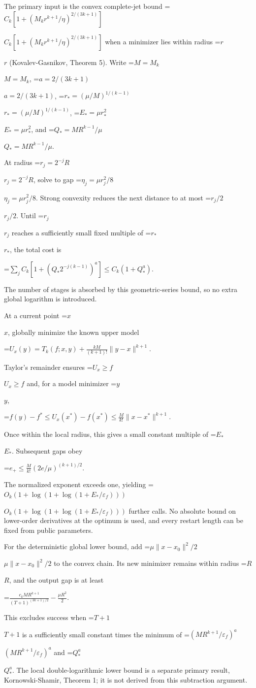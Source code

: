 \documentclass[10pt,a4paper]{article}
\newcommand{\AtlasMath}[1]{\par\begingroup\centering\setbox0=\hbox{$\displaystyle #1$}\ifdim\wd0>1.4\linewidth\typeout{ATLAS WIDE FORMULA: \the\wd0}\fi\ifdim\wd0>\linewidth\resizebox{\linewidth}{!}{\box0}\else\box0\fi\par\endgroup}
\newcommand{\AtlasInlineMath}[1]{\begingroup\setbox0=\hbox{$#1$}\ifdim\wd0>.4\linewidth\endgroup\AtlasMath{#1}\else\endgroup$#1$\fi}
\begin{document}
The primary input is the convex complete-jet bound \AtlasInlineMath{C_k[1+(M_kr^{k+1}/\eta)^{2/(3k+1)}]} when a minimizer lies within radius \AtlasInlineMath{r} (Kovalev-Gasnikov, Theorem 5). Write \AtlasInlineMath{M=M_k}, \AtlasInlineMath{a=2/(3k+1)}, \AtlasInlineMath{r_*=(\mu/M)^{1/(k-1)}}, \AtlasInlineMath{E_* =\mu r_*^2}, and \AtlasInlineMath{Q_*=MR^{k-1}/\mu}.

At radius \AtlasInlineMath{r_j=2^{-j}R}, solve to gap \AtlasInlineMath{\eta_j=\mu r_j^2/8}. Strong convexity reduces the next distance to at most \AtlasInlineMath{r_j/2}. Until \AtlasInlineMath{r_j} reaches a sufficiently small fixed multiple of \AtlasInlineMath{r_*}, the total cost is

\AtlasMath{\sum_j C_k[1+(Q_*2^{-j(k-1)})^a]\le C_k(1+Q_*^a).}

The number of stages is absorbed by this geometric-series bound, so no extra global logarithm is introduced.

At a current point \AtlasInlineMath{x}, globally minimize the known upper model

\AtlasMath{U_x(y)=T_k(f;x,y)+\frac{kM}{(k+1)!}\|y-x\|^{k+1}.}

Taylor's remainder ensures \AtlasInlineMath{U_x\ge f} and, for a model minimizer \AtlasInlineMath{y},

\AtlasMath{f(y)-f^*\le U_x(x^*)-f(x^*)\le\frac M{k!}\|x-x^*\|^{k+1}.}

Once within the local radius, this gives a small constant multiple of \AtlasInlineMath{E_*}. Subsequent gaps obey

\AtlasMath{e_+\le\frac M{k!}(2e/\mu)^{(k+1)/2}.}

The normalized exponent exceeds one, yielding \AtlasInlineMath{O_k(1+\log(1+\log(1+E_*/\varepsilon_f)))} further calls. No absolute bound on lower-order derivatives at the optimum is used, and every restart length can be fixed from public parameters.

For the deterministic global lower bound, add \AtlasInlineMath{\mu\|x-x_0\|^2/2} to the convex chain. Its new minimizer remains within radius \AtlasInlineMath{R}, and the output gap is at least

\AtlasMath{\frac{c_kMR^{k+1}}{(T+1)^{(3k+1)/2}}-\frac{\mu R^2}{2}.}

This excludes success when \AtlasInlineMath{T+1} is a sufficiently small constant times the minimum of \AtlasInlineMath{(MR^{k+1}/\varepsilon_f)^a} and \AtlasInlineMath{Q_*^a}. The local double-logarithmic lower bound is a separate primary result, Kornowski-Shamir, Theorem 1; it is not derived from this subtraction argument.
\end{document}
